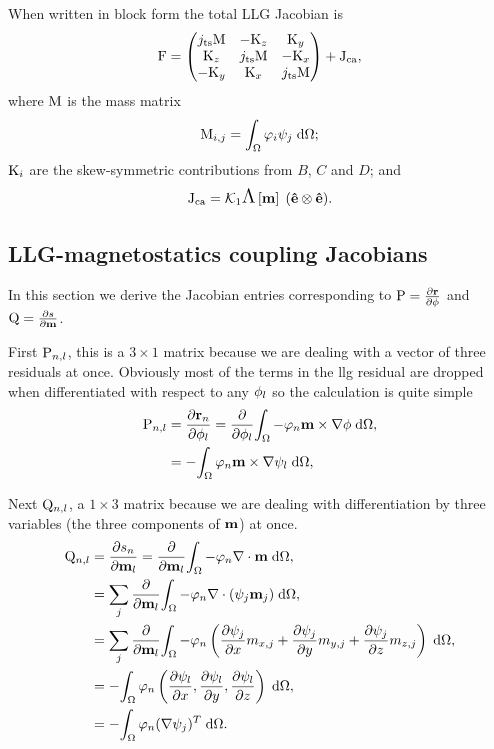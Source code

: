 When written in block form the total LLG Jacobian is
\begin{equation}
  \mathrm{F} =
  \begin{pmatrix}
    j_\text{ts} \mathrm{M}    & -\mathrm{K}_z       & \mathrm{K}_y \\
    \mathrm{K}_z         & j_\text{ts}\mathrm{M}    & -\mathrm{K}_x \\
    -\mathrm{K}_y        & \mathrm{K}_x        & j_\text{ts} \mathrm{M}
  \end{pmatrix} + \mathrm{J}_\text{ca},
\end{equation}
where $\mathrm{M}$ is the mass matrix
\begin{equation}
  \label{eq:mass-matrix}
  \mathrm{M}_{i,j} = {\int_{\Omega} \varphi_i \psi_j {\; \text{d}} {\Omega}};
\end{equation}
$\mathrm{K}_i$ are the skew-symmetric contributions from $B$, $C$ and $D$; and
\begin{equation}
  \mathrm{J}_\text{ca} = \mathcal{K}_1 \text{\Large{$\Lambda$}}\left[ \mathbf{m} \right] \; (\mathbf{\hat{e}}  \otimes \mathbf{\hat{e}}).
\end{equation}

\subsection{LLG-magnetostatics coupling Jacobians}
\label{sec:llg-magn-coupl}

In this section we derive the Jacobian entries corresponding to $\mathrm{P} = \frac{\partial \mathbf{r}}{\partial \phi}$ and $\mathrm{Q} = \frac{\partial s}{\partial \mathbf{m}}$.

First $\mathrm{P}_{n,l}$, this is a $3 \times 1$ matrix because we are dealing with a vector of three residuals at once.
Obviously most of the terms in the llg residual are dropped when differentiated with respect to any $\phi_{l}$ so the calculation is quite simple
\begin{equation}
  \begin{aligned}
    \mathrm{P}_{n,l} &= \frac{\partial \mathbf{r}_n}{\partial \phi_l} 
    = \frac{\partial }{\partial \phi_l} {\int_{\Omega}  -\varphi_n \mathbf{m} \times \nabla \phi {\; \text{d}} {\Omega}}, \\
    &= -{\int_{\Omega}  \varphi_n \mathbf{m} \times \nabla \psi_l {\; \text{d}} {\Omega}}, \\
  \end{aligned}
\end{equation}

Next $\mathrm{Q}_{n,l}$, a $1 \times 3$ matrix because we are dealing with differentiation by three variables (the three components of $\mathbf{m}$) at once.
\begin{equation}
  \begin{aligned}
    \mathrm{Q}_{n,l} &= \frac{\partial s_n}{\partial \mathbf{m}_l} = \frac{\partial }{\partial \mathbf{m}_l} {\int_{\Omega}  -\varphi_n \nabla \cdot \mathbf{m} {\; \text{d}} {\Omega}}, \\
    &= \sum_j \frac{\partial }{\partial \mathbf{m}_l} {\int_{\Omega}  -\varphi_n \nabla \cdot (\psi_j \mathbf{m}_j) {\; \text{d}} {\Omega}}, \\
    &= \sum_j \frac{\partial }{\partial \mathbf{m}_l} {\int_{\Omega}  -\varphi_n \left( \frac{\partial \psi_j}{\partial x} m_{x,j} 
        + \frac{\partial \psi_j}{\partial y} m_{y,j} + \frac{\partial \psi_j}{\partial z} m_{z,j} \right)  {\; \text{d}} {\Omega}}, \\
    &= -{\int_{\Omega}  \varphi_n \left( \frac{\partial \psi_l}{\partial x}, 
        \frac{\partial \psi_l}{\partial y}, \frac{\partial \psi_l}{\partial z} \right)  {\; \text{d}} {\Omega}}, \\
    &= -{\int_{\Omega} \varphi_n (\nabla \psi_j)^T {\; \text{d}} {\Omega}}.
  \end{aligned}
\end{equation}

